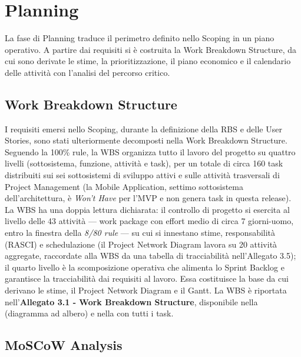 \chapter{Planning}

La fase di Planning traduce il perimetro definito nello Scoping in un piano operativo. A partire dai requisiti si è costruita la Work Breakdown Structure, da cui sono derivate le stime, la prioritizzazione, il piano economico e il calendario delle attività con l'analisi del percorso critico.

\section{Work Breakdown Structure}

I requisiti emersi nello Scoping, durante la definizione della RBS e delle User Stories, sono stati ulteriormente decomposti nella Work Breakdown Structure. Seguendo la 100\% rule, la WBS organizza tutto il lavoro del progetto su quattro livelli (sottosistema, funzione, attività e task), per un totale di circa 160 task distribuiti sui sei sottosistemi di sviluppo attivi e sulle attività trasversali di Project Management (la Mobile Application, settimo sottosistema dell'architettura, è \textit{Won't Have} per l'MVP e non genera task in questa release). La WBS ha una doppia lettura dichiarata: il controllo di progetto si esercita al livello delle 43 attività --- work package con effort medio di circa 7 giorni-uomo, entro la finestra della \textit{8/80 rule} --- su cui si innestano stime, responsabilità (RASCI) e schedulazione (il Project Network Diagram lavora su 20 attività aggregate, raccordate alla WBS da una tabella di tracciabilità nell'Allegato 3.5); il quarto livello è la scomposizione operativa che alimenta lo Sprint Backlog e garantisce la tracciabilità dai requisiti al lavoro. Essa costituisce la base da cui derivano le stime, il Project Network Diagram e il Gantt. La WBS è riportata nell'\textbf{Allegato 3.1 - Work Breakdown Structure}, disponibile nella  (diagramma ad albero) e nella  con tutti i task.

\section{MoSCoW Analysis}

